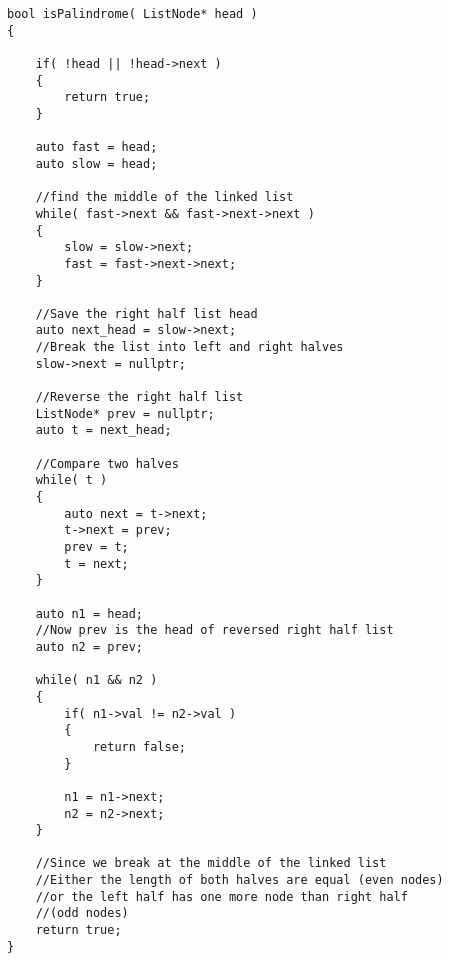 \begin{lstlisting}[style=customc, caption={Find Middle Reverse Right Half}]
bool isPalindrome( ListNode* head )
{

    if( !head || !head->next )
    {
        return true;
    }

    auto fast = head;
    auto slow = head;

    //find the middle of the linked list
    while( fast->next && fast->next->next )
    {
        slow = slow->next;
        fast = fast->next->next;
    }

    //Save the right half list head
    auto next_head = slow->next;
    //Break the list into left and right halves
    slow->next = nullptr;

    //Reverse the right half list
    ListNode* prev = nullptr;
    auto t = next_head;

    //Compare two halves
    while( t )
    {
        auto next = t->next;
        t->next = prev;
        prev = t;
        t = next;
    }

    auto n1 = head;
    //Now prev is the head of reversed right half list
    auto n2 = prev;

    while( n1 && n2 )
    {
        if( n1->val != n2->val )
        {
            return false;
        }

        n1 = n1->next;
        n2 = n2->next;
    }

    //Since we break at the middle of the linked list
    //Either the length of both halves are equal (even nodes)
    //or the left half has one more node than right half
    //(odd nodes)
    return true;
}
\end{lstlisting}
